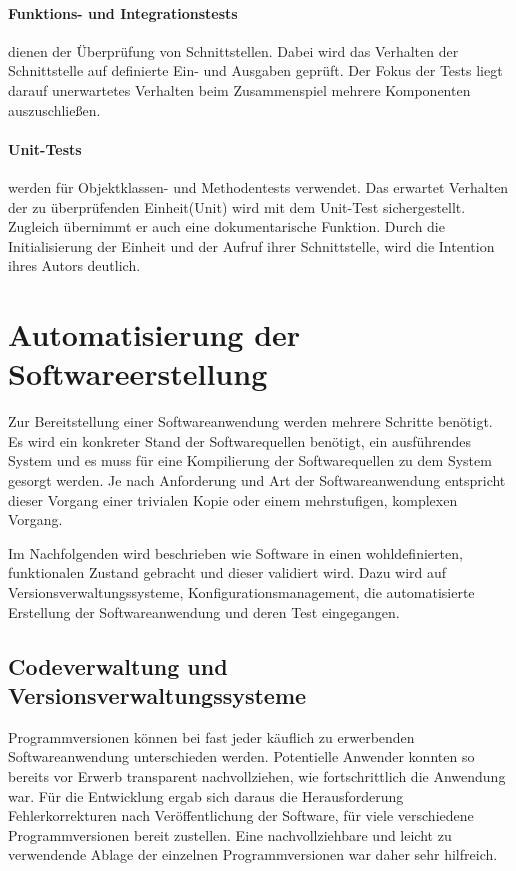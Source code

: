 \paragraph{Funktions- und Integrationstests}

dienen der Überprüfung von Schnittstellen. Dabei wird das Verhalten der Schnittstelle auf definierte Ein- und Ausgaben geprüft. Der Fokus der Tests liegt darauf unerwartetes Verhalten beim Zusammenspiel mehrere Komponenten auszuschließen.

\paragraph{Unit-Tests}

werden für Objektklassen- und Methodentests verwendet. Das erwartet Verhalten der zu überprüfenden Einheit(Unit) wird mit dem Unit-Test sichergestellt. Zugleich übernimmt er auch eine dokumentarische Funktion. Durch die Initialisierung der Einheit und der Aufruf ihrer Schnittstelle, wird die Intention ihres Autors deutlich.

\section{Automatisierung der Softwareerstellung}
\label{sec:automation-software}

Zur Bereitstellung einer Softwareanwendung werden mehrere Schritte benötigt. Es wird ein konkreter Stand der Softwarequellen benötigt, ein ausführendes System und es muss für eine Kompilierung der Softwarequellen zu dem System gesorgt werden.
Je nach Anforderung und Art der Softwareanwendung entspricht dieser Vorgang einer trivialen Kopie oder einem mehrstufigen, komplexen Vorgang. 

Im Nachfolgenden wird beschrieben wie Software in einen wohldefinierten, funktionalen Zustand gebracht und dieser validiert wird. Dazu wird auf Versionsverwaltungssysteme, Konfigurationsmanagement, die automatisierte Erstellung der Softwareanwendung und deren Test eingegangen.

\subsection{Codeverwaltung und Versionsverwaltungssysteme}

Programmversionen können bei fast jeder käuflich zu erwerbenden Softwareanwendung unterschieden werden. Potentielle 
Anwender konnten so bereits vor Erwerb transparent nachvollziehen, wie fortschrittlich die Anwendung war.
Für die Entwicklung ergab sich daraus die Herausforderung Fehlerkorrekturen nach Veröffentlichung der Software, für viele 
verschiedene Programmversionen bereit zustellen.
Eine nachvollziehbare und leicht zu verwendende Ablage der einzelnen Programmversionen war daher sehr hilfreich.

